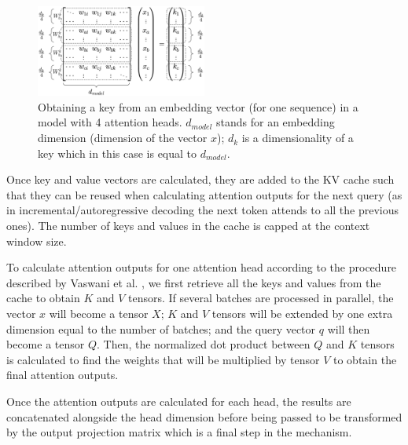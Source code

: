 \begin{figure}[htbp] %
    \centering
    \includegraphics[width=0.5\textwidth]{research paper/images/obtaining_key.png} %
    \captionsetup{justification=centering}
    \caption{Obtaining a key from an embedding vector (for one sequence) in a model with 4 attention heads. $d_{model}$ stands for an embedding dimension (dimension of the vector $x$); $d_k$ is a dimensionality of a key which in this case is equal to $d_{model}$.}
    \label{fig:obtaining_key}
\end{figure}

Once key and value vectors are calculated, they are added to the KV cache such that they can be reused when calculating attention outputs for the next query (as in incremental/autoregressive decoding the next token attends to all the previous ones). The number of keys and values in the cache is capped at the context window size.   

To calculate attention outputs for one attention head according to the procedure described by Vaswani et al. \cite{vaswani_attention_2017}, we first retrieve all the keys and values from the cache to obtain $K$ and $V$ tensors. If several batches are processed in parallel, the vector $x$ will become a tensor $X$; $K$ and $V$ tensors will be extended by one extra dimension equal to the number of batches; and the query vector $q$ will then become a tensor $Q$. Then, the normalized dot product between $Q$ and $K$ tensors is calculated to find the weights that will be multiplied by tensor $V$ to obtain the final attention outputs.

Once the attention outputs are calculated for each head, the results are concatenated alongside the head dimension before being passed to be transformed by the output projection matrix which is a final step in the mechanism. 


